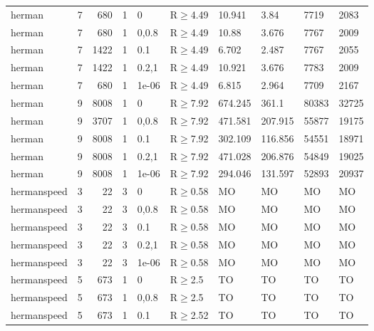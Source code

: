 \begin{longtable}{llrrllllll}
 herman        & 7        &    	680 &   1 & 0     & R$\geq$4.49  & 10.941   & 3.84     & 7719    & 2083   \\
 herman        & 7        &    	680 &   1 & 0,0.8 & R$\geq$4.49  & 10.88    & 3.676    & 7767    & 2009   \\
 herman        & 7        &   	1422 &   1 & 0.1   & R$\geq$4.49  & 6.702    & 2.487    & 7767    & 2055   \\
 herman        & 7        &   	1422 &   1 & 0.2,1 & R$\geq$4.49  & 10.921   & 3.676    & 7783    & 2009   \\
 herman        & 7        &    	680 &   1 & 1e-06 & R$\geq$4.49  & 6.815    & 2.964    & 7709    & 2167   \\
 herman        & 9        &   	8008 &   1 & 0     & R$\geq$7.92  & 674.245  & 361.1    & 80383   & 32725  \\
 herman        & 9        &   	3707 &   1 & 0,0.8 & R$\geq$7.92  & 471.581  & 207.915  & 55877   & 19175  \\
 herman        & 9        &   	8008 &   1 & 0.1   & R$\geq$7.92  & 302.109  & 116.856  & 54551   & 18971  \\
 herman        & 9        &   	8008 &   1 & 0.2,1 & R$\geq$7.92  & 471.028  & 206.876  & 54849   & 19025  \\
 herman        & 9        &   	8008 &   1 & 1e-06 & R$\geq$7.92  & 294.046  & 131.597  & 52893   & 20937  \\
 hermanspeed   & 3        &     	22 &   3 & 0     & R$\geq$0.58  & MO       & MO       & MO      & MO     \\
 hermanspeed   & 3        &     	22 &   3 & 0,0.8 & R$\geq$0.58  & MO       & MO       & MO      & MO     \\
 hermanspeed   & 3        &     	22 &   3 & 0.1   & R$\geq$0.58  & MO       & MO       & MO      & MO     \\
 hermanspeed   & 3        &     	22 &   3 & 0.2,1 & R$\geq$0.58  & MO       & MO       & MO      & MO     \\
 hermanspeed   & 3        &     	22 &   3 & 1e-06 & R$\geq$0.58  & MO       & MO       & MO      & MO     \\
 hermanspeed   & 5        &    	673 &   1 & 0     & R$\geq$2.5   & TO       & TO       & TO      & TO     \\
 hermanspeed   & 5        &    	673 &   1 & 0,0.8 & R$\geq$2.5   & TO       & TO       & TO      & TO     \\
 hermanspeed   & 5        &    	673 &   1 & 0.1   & R$\geq$2.52  & TO       & TO       & TO      & TO     \\

\end{longtable}
